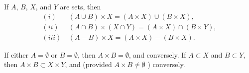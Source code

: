\begin{named}[EXERCISE.  ] If $A$, $B$, $X$, and $Y$ are sets, then 
\begin{align*} 
(i)& \: (A \cup B) \times X = ( A \times X ) \cup ( B \times X), \\
(ii)& \:  (A \cap B ) \times ( X \cap Y) = (A \times X) \cap ( B \times Y),\\
(iii)& \: (A - B ) \times X = (A \times X) - (B \times X).
\end{align*}

If either $A = \emptyset $ or $B = \emptyset $, then $ A \times B = \emptyset $, and conversely. If $ A \subset X $ and $B \subset Y$, then $A \times B \subset X \times Y$, and (provided $A \times B \neq \emptyset $ ) conversely. 
\end{named}